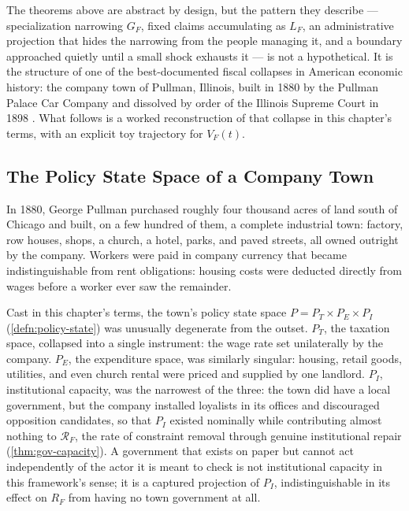 \documentclass[12pt,twoside,openright]{book}
\begin{document}
The theorems above are abstract by design, but the pattern they
describe --- specialization narrowing $G_F$, fixed claims
accumulating as $L_F$, an administrative projection that hides
the narrowing from the people managing it, and a boundary
approached quietly until a small shock exhausts it --- is not a
hypothetical. It is the structure of one of the best-documented
fiscal collapses in American economic history: the company town
of Pullman, Illinois, built in 1880 by the Pullman Palace Car
Company and dissolved by order of the Illinois Supreme Court in
1898 \parencite{buder1967}. What follows is a worked
reconstruction of that collapse in this chapter's terms, with an
explicit toy trajectory for $V_F(t)$.

\subsection{The Policy State Space of a Company Town}

In 1880, George Pullman purchased roughly four thousand acres of
land south of Chicago and built, on a few hundred of them, a
complete industrial town: factory, row houses, shops, a church,
a hotel, parks, and paved streets, all owned outright by the
company. Workers were paid in company currency that became
indistinguishable from rent obligations: housing costs were
deducted directly from wages before a worker ever saw the
remainder.

Cast in this chapter's terms, the town's policy state space
$P = P_T \times P_E \times P_I$ (\cref{defn:policy-state}) was
unusually degenerate from the outset. $P_T$, the taxation
space, collapsed into a single instrument: the wage rate set
unilaterally by the company. $P_E$, the expenditure space, was
similarly singular: housing, retail goods, utilities, and even
church rental were priced and supplied by one landlord. $P_I$,
institutional capacity, was the narrowest of the three: the town
did have a local government, but the company installed loyalists
in its offices and discouraged opposition candidates, so that
$P_I$ existed nominally while contributing almost nothing to
$\mathcal{R}_F$, the rate of constraint removal through genuine
institutional repair (\cref{thm:gov-capacity}). A government that
exists on paper but cannot act independently of the actor it is
meant to check is not institutional capacity in this framework's
sense; it is a captured projection of $P_I$, indistinguishable in
its effect on $R_F$ from having no town government at all.
\end{document}

